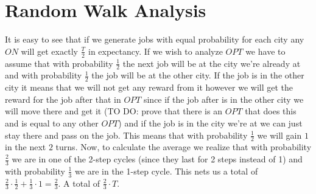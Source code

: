 \documentclass[]{article}
\begin{document}
\section{Random Walk Analysis}

It is easy to see that if we generate jobs with equal probability for each city any $ ON $ will get exactly $ \frac{T}{2} $ in expectancy. If we wish to analyze $ OPT $ we have to assume that with probability $ \frac{1}{2} $ the next job will be at the city we're already at and with probability $ \frac{1}{2} $ the job will be at the other city. If the job is in the other city it means that we will not get any reward from it however we will get the reward for the job after that in $ OPT $ since if the job after is in the other city we will move there and get it (TO DO: prove that there is an $ OPT $ that does this and is equal to any other $ OPT $) and if the job is in the city we're at we can just stay there and pass on the job. This means that with probability $ \frac{1}{2} $ we will gain $ 1 $ in the next $ 2 $ turns. Now, to calculate the average we realize that with probability $ \frac{2}{3} $ we are in one of the 2-step cycles (since they last for 2 steps instead of 1) and with probability $ \frac{1}{3} $ we are in the 1-step cycle. This nets us a total of $ \frac{2}{3} \cdot \frac{1}{2} + \frac{1}{3} \cdot 1 = \frac{2}{3} $. A total of $ \frac{2}{3} \cdot T $.
\end{document}
